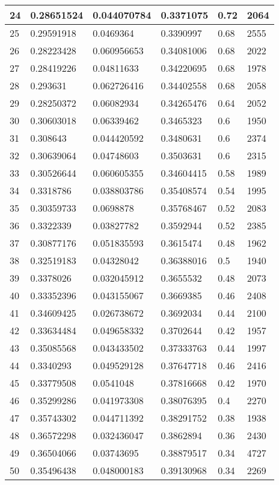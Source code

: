 \begin{longtable}{|l|l|l|l|l|l|}
24 & 0.28651524 & 0.044070784 & 0.3371075 & 0.72 & 2064 \\ \hline 
25 & 0.29591918 & 0.0469364 & 0.3390997 & 0.68 & 2555 \\ \hline 
26 & 0.28223428 & 0.060956653 & 0.34081006 & 0.68 & 2022 \\ \hline 
27 & 0.28419226 & 0.04811633 & 0.34220695 & 0.68 & 1978 \\ \hline 
28 & 0.293631 & 0.062726416 & 0.34402558 & 0.68 & 2058 \\ \hline 
29 & 0.28250372 & 0.06082934 & 0.34265476 & 0.64 & 2052 \\ \hline 
30 & 0.30603018 & 0.06339462 & 0.3465323 & 0.6 & 1950 \\ \hline 
31 & 0.308643 & 0.044420592 & 0.3480631 & 0.6 & 2374 \\ \hline 
32 & 0.30639064 & 0.04748603 & 0.3503631 & 0.6 & 2315 \\ \hline 
33 & 0.30526644 & 0.060605355 & 0.34604415 & 0.58 & 1989 \\ \hline 
34 & 0.3318786 & 0.038803786 & 0.35408574 & 0.54 & 1995 \\ \hline 
35 & 0.30359733 & 0.0698878 & 0.35768467 & 0.52 & 2083 \\ \hline 
36 & 0.3322339 & 0.03827782 & 0.3592944 & 0.52 & 2385 \\ \hline 
37 & 0.30877176 & 0.051835593 & 0.3615474 & 0.48 & 1962 \\ \hline 
38 & 0.32519183 & 0.04328042 & 0.36388016 & 0.5 & 1940 \\ \hline 
39 & 0.3378026 & 0.032045912 & 0.3655532 & 0.48 & 2073 \\ \hline 
40 & 0.33352396 & 0.043155067 & 0.3669385 & 0.46 & 2408 \\ \hline 
41 & 0.34609425 & 0.026738672 & 0.3692034 & 0.44 & 2100 \\ \hline 
42 & 0.33634484 & 0.049658332 & 0.3702644 & 0.42 & 1957 \\ \hline 
43 & 0.35085568 & 0.043433502 & 0.37333763 & 0.44 & 1997 \\ \hline 
44 & 0.3340293 & 0.049529128 & 0.37647718 & 0.46 & 2416 \\ \hline 
45 & 0.33779508 & 0.0541048 & 0.37816668 & 0.42 & 1970 \\ \hline 
46 & 0.35299286 & 0.041973308 & 0.38076395 & 0.4 & 2270 \\ \hline 
47 & 0.35743302 & 0.044711392 & 0.38291752 & 0.38 & 1938 \\ \hline 
48 & 0.36572298 & 0.032436047 & 0.3862894 & 0.36 & 2430 \\ \hline 
49 & 0.36504066 & 0.03743695 & 0.38879517 & 0.34 & 4727 \\ \hline 
50 & 0.35496438 & 0.048000183 & 0.39130968 & 0.34 & 2269 \\ \hline 
\end{longtable}